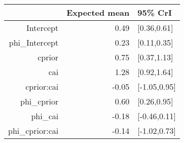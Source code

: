 \begin{tabular}{rrl}
  \hline
 & Expected mean & 95\% CrI \\ 
  \hline
Intercept & 0.49 & [0.36,0.61] \\ 
  phi\_Intercept & 0.23 & [0.11,0.35] \\ 
  cprior & 0.75 & [0.37,1.13] \\ 
  cai & 1.28 & [0.92,1.64] \\ 
  cprior:cai & -0.05 & [-1.05,0.95] \\ 
  phi\_cprior & 0.60 & [0.26,0.95] \\ 
  phi\_cai & -0.18 & [-0.46,0.11] \\ 
  phi\_cprior:cai & -0.14 & [-1.02,0.73] \\ 
   \hline
\end{tabular}

